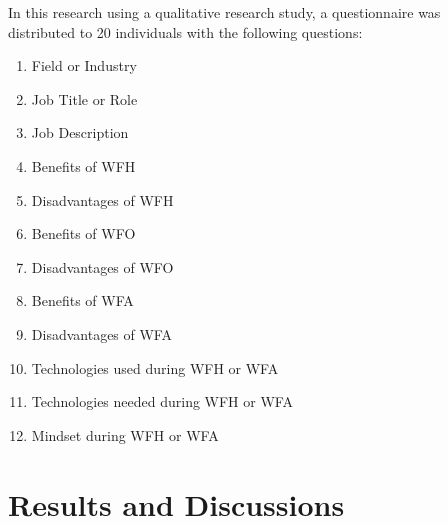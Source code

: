 \documentclass[conference]{IEEEtran}
\begin{document}
In this research using a qualitative research study, a questionnaire was distributed to 20 individuals with the following questions:
\begin{enumerate}
\item Field or Industry
\item Job Title or Role
\item Job Description
\item Benefits of WFH
\item Disadvantages of WFH
\item Benefits of WFO
\item Disadvantages of WFO
\item Benefits of WFA
\item Disadvantages of WFA
\item Technologies used during WFH or WFA
\item Technologies needed during WFH or WFA
\item Mindset during WFH or WFA
\end{enumerate}

\section{Results and Discussions}
\end{document}
